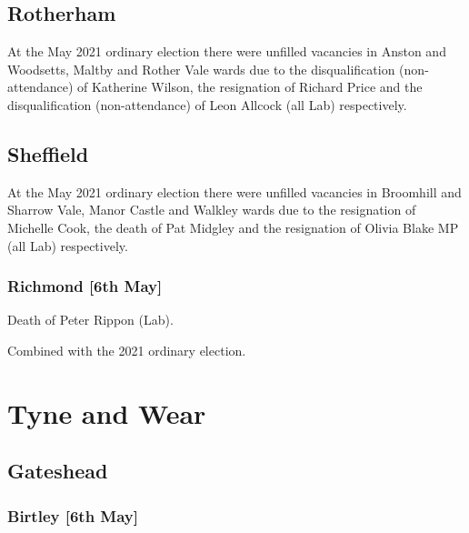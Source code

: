 \documentclass[a4paper,openany]{book}
\begin{document}
\begin{resultsiii}
\subsection*{Rotherham}

At the May 2021 ordinary election there were unfilled vacancies in Anston and Woodsetts, Maltby and Rother Vale wards due to the disqualification (non-attendance) of Katherine Wilson, the resignation of Richard Price and the disqualification (non-attendance) of Leon Allcock (all Lab) respectively.

\subsection*{Sheffield}

At the May 2021 ordinary election there were unfilled vacancies in Broomhill and Sharrow Vale, Manor Castle and Walkley wards due to the resignation of Michelle Cook, the death of Pat Midgley and the resignation of Olivia Blake MP (all Lab) respectively.

\subsubsection*{Richmond \hspace*{\fill}\nolinebreak[1]%
	\enspace\hspace*{\fill}
	[6th May]}


Death of Peter Rippon (Lab).

Combined with the 2021 ordinary election.

\section{Tyne and Wear}

\subsection*{Gateshead}

\subsubsection*{Birtley \hspace*{\fill}\nolinebreak[1]%
	\enspace\hspace*{\fill}
	[6th May]}


\end{resultsiii}
\end{document}
